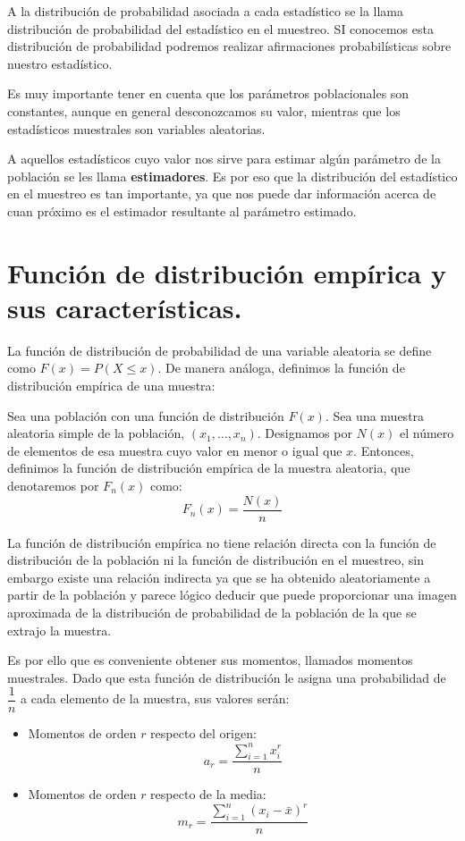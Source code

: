 A la distribuci\'on de probabilidad asociada a cada estad\'istico se la llama distribuci\'on de probabilidad del estad\'istico en el muestreo. SI conocemos esta distribuci\'on de probabilidad podremos realizar afirmaciones probabil\'isticas sobre nuestro estad\'istico.

Es muy importante tener en cuenta que los par\'ametros poblacionales son constantes, aunque en general desconozcamos su valor, mientras que los estad\'isticos muestrales son variables aleatorias.

A aquellos estad\'isticos cuyo valor nos sirve para estimar alg\'un par\'ametro de la poblaci\'on se les llama \textbf{estimadores}. Es por eso que la distribuci\'on del estad\'istico en el muestreo es tan importante, ya que nos puede dar informaci\'on acerca de cuan pr\'oximo es el estimador resultante al par\'ametro estimado.

\section{Funci\'on de distribuci\'on emp\'irica y sus caracter\'isticas.}

La funci\'on de distribuci\'on de probabilidad de una variable aleatoria se define como $F(x)=P(X\leq x)$. De manera an\'aloga, definimos la funci\'on de distribuci\'on emp\'irica de una muestra:
\begin{definicion}
Sea una poblaci\'on con una funci\'on de distribuci\'on $F(x)$. Sea una muestra aleatoria simple de la poblaci\'on, $(x_1,\ldots,x_n)$. Designamos por $N(x)$ el n\'umero de elementos de esa muestra cuyo valor en menor o igual que $x$. Entonces, definimos la funci\'on de distribuci\'on emp\'irica de la muestra aleatoria, que denotaremos por $F_n(x)$ como:
\begin{equation*}
F_n(x)=\dfrac{N(x)}{n}
\end{equation*}
\end{definicion}


La funci\'on de distribuci\'on emp\'irica no tiene relaci\'on directa con la funci\'on de distribuci\'on de la poblaci\'on ni la funci\'on de distribuci\'on en el muestreo, sin embargo existe una relaci\'on indirecta ya que se ha obtenido aleatoriamente a partir de la poblaci\'on y parece l\'ogico deducir que puede proporcionar una imagen aproximada de la distribuci\'on de probabilidad de la poblaci\'on de la que se extrajo la muestra.

Es por ello que es conveniente obtener sus momentos, llamados momentos muestrales. Dado que esta funci\'on de distribuci\'on le asigna una probabilidad de $\dfrac{1}{n}$ a cada elemento de la muestra, sus valores ser\'an:
\begin{itemize}
\item Momentos de orden $r$ respecto del origen:
\begin{equation*}
a_r=\dfrac{\sum_{i=1}^nx_i^r}{n}
\end{equation*}
\item Momentos de orden $r$ respecto de la media:
\begin{equation*}
m_r=\dfrac{\sum_{i=1}^n\left(x_i-\bar{x}\right)^r}{n}
\end{equation*}
\end{itemize}

